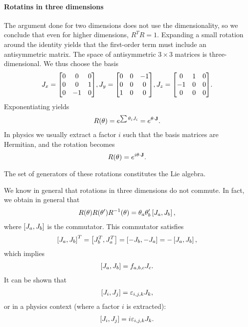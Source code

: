 \paragraph{Rotatins in three dimensions}
The argument done for two dimensions does not use the dimensionality, so we conclude that even for higher dimensions, $R^{T}R = 1$. Expanding a small rotation around the identity yields that the first-order term must include an antisymmetric matrix. The space of antisymmetric $3\times 3$ matrices is three-dimensional. We thus choose the basis
\begin{align*}
	J_{x} =
	\mqty[
		0 & 0  & 0 \\
		0 & 0  & 1 \\
		0 & -1 & 0
	],
	J_{y} =
	\mqty[
		0 & 0 & -1 \\
		0 & 0 & 0  \\
		1 & 0 & 0
	],
	J_{z} =
	\mqty[
		0  & 1 & 0 \\
		-1 & 0 & 0 \\
		0  & 0 & 0
	].
\end{align*}
Exponentiating yields
\begin{align*}
	R(\theta) = e^{\sum \theta_{i}J_{i}} = e^{\vb{\theta}\cdot\vb{J}}.
\end{align*}
In physics we usually extract a factor $i$ such that the basis matrices are Hermitian, and the rotation becomes
\begin{align*}
	R(\theta) = e^{i\vb{\theta}\cdot\vb{J}}.
\end{align*}

The set of generators of these rotations constitutes the Lie algebra.

We know in general that rotations in three dimensions do not commute. In fact, we obtain in general that
\begin{align*}
	R(\vb{\theta})R(\vb{\theta}')R^{-1}(\vb{\theta}) = \theta_{a}\theta_{b}'\left[J_{a}, J_{b}\right],
\end{align*}
where $\left[J_{a}, J_{b}\right]$ is the commutator. This commutator satisfies
\begin{align*}
	\left[J_{a}, J_{b}\right]^{T} = \left[J_{b}^{T}, J_{a}^{T}\right] = \left[-J_{b}, -J_{a}\right] = -\left[J_{a}, J_{b}\right],
\end{align*}
which implies
\begin{align*}
	\left[J_{a}, J_{b}\right] = f_{a,b,c}J_{c}.
\end{align*}
It can be shown that
\begin{align*}
	\left[J_{i}, J_{j}\right] = \varepsilon_{i,j,k}J_{k},
\end{align*}
or in a physics context (where a factor $i$ is extracted):
\begin{align*}
	\left[J_{i}, J_{j}\right] = i\varepsilon_{i,j,k}J_{k}.
\end{align*}

